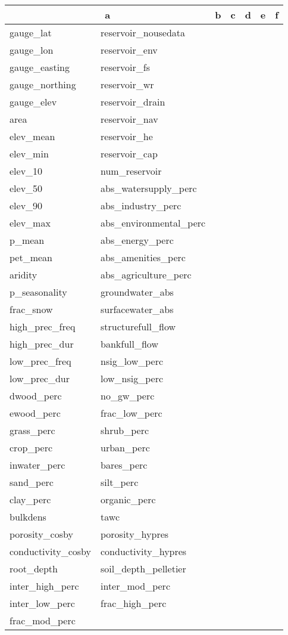 \begin{tabular}{ll|lllll}
\hline 
\multicolumn {2}{c}{a}  &  b & c & d & e & f \\
\hline
gauge\_lat & reservoir\_nousedata \\
gauge\_lon & reservoir\_env \\
gauge\_easting & reservoir\_fs \\
gauge\_northing & reservoir\_wr \\
gauge\_elev  & reservoir\_drain \\
area & reservoir\_nav \\
elev\_mean & reservoir\_he \\
elev\_min & reservoir\_cap \\
elev\_10 & num\_reservoir \\
elev\_50 & abs\_watersupply\_perc \\
elev\_90  & abs\_industry\_perc \\
elev\_max & abs\_environmental\_perc \\
p\_mean  & abs\_energy\_perc \\
pet\_mean  & abs\_amenities\_perc \\
aridity & abs\_agriculture\_perc \\
p\_seasonality & groundwater\_abs \\
frac\_snow & surfacewater\_abs \\
high\_prec\_freq & structurefull\_flow \\
high\_prec\_dur & bankfull\_flow \\ 
low\_prec\_freq  & nsig\_low\_perc \\
low\_prec\_dur & low\_nsig\_perc \\
dwood\_perc & no\_gw\_perc \\
ewood\_perc & frac\_low\_perc \\
grass\_perc & shrub\_perc \\
crop\_perc & urban\_perc \\
inwater\_perc & bares\_perc \\
sand\_perc & silt\_perc \\
clay\_perc & organic\_perc \\
bulkdens & tawc \\
porosity\_cosby & porosity\_hypres \\
conductivity\_cosby & conductivity\_hypres \\
root\_depth & soil\_depth\_pelletier \\
inter\_high\_perc & inter\_mod\_perc \\
inter\_low\_perc & frac\_high\_perc \\
frac\_mod\_perc \\
\end{tabular}
